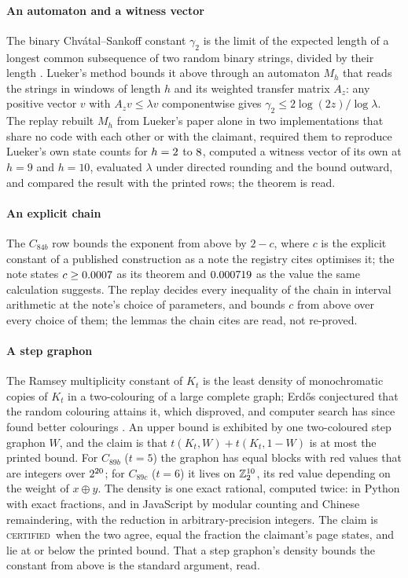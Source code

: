 \documentclass[preprint,11pt,authoryear,a4paper]{elsarticle}
\newcommand{\vword}[1]{{\normalfont\scshape #1}}
\newcommand{\vC}{\vword{certified}}
\newcommand{\Z}{\mathbb{Z}}
\begin{document}
\paragraph{An automaton and a witness vector} The binary Chv\'atal--Sankoff constant $\gamma_2$ is the limit of the expected length of a longest common subsequence of two random binary strings, divided by their length \citep{ChvatalSankoff75}. Lueker's method \citep{Lueker09} bounds it above through an automaton $M_h$ that reads the strings in windows of length $h$ and its weighted transfer matrix $A_z$: any positive vector $v$ with $A_z v \le \lambda v$ componentwise gives $\gamma_2 \le 2\log(2z)/\log\lambda$. The replay rebuilt $M_h$ from Lueker's paper alone in two implementations that share no code with each other or with the claimant, required them to reproduce Lueker's own state counts for $h = 2$ to $8$, computed a witness vector of its own at $h = 9$ and $h = 10$, evaluated $\lambda$ under directed rounding and the bound outward, and compared the result with the printed rows; the theorem is read.

\paragraph{An explicit chain} The $C_{84b}$ row bounds the exponent from above by $2 - c$, where $c$ is the explicit constant of a published construction as a note the registry cites optimises it; the note states $c \ge 0.0007$ as its theorem and $0.000719$ as the value the same calculation suggests. The replay decides every inequality of the chain in interval arithmetic at the note's choice of parameters, and bounds $c$ from above over every choice of them; the lemmas the chain cites are read, not re-proved.

\paragraph{A step graphon} The Ramsey multiplicity constant of $K_t$ is the least density of monochromatic copies of $K_t$ in a two-colouring of a large complete graph; Erd\H{o}s conjectured that the random colouring attains it, which \citet{Thomason89} disproved, and computer search has since found better colourings \citep{PPSS22}. An upper bound is exhibited by one two-coloured step graphon $W$, and the claim is that $t(K_t, W) + t(K_t, 1 - W)$ is at most the printed bound. For $C_{89b}$ ($t = 5$) the graphon has \OcGnBlocksB{} equal blocks with red values that are integers over $2^{20}$; for $C_{89c}$ ($t = 6$) it lives on $\Z_2^{\OcGnCubeC}$, its red value depending on the weight of $x \oplus y$. The density is one exact rational, computed twice: in Python with exact fractions, and in JavaScript by modular counting and Chinese remaindering, with the reduction in arbitrary-precision integers. The claim is \vC\ when the two agree, equal the fraction the claimant's page states, and lie at or below the printed bound. That a step graphon's density bounds the constant from above is the standard argument, read.
\end{document}
